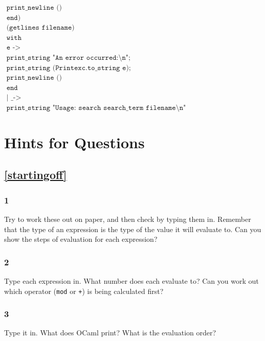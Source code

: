 \documentclass[]{book}
\newcommand{\smspace}{\vspace{4mm}}
\begin{document}
\begin{center}
{\begin{minipage}{0.9\textwidth}
$\texttt{\ \ \ \ \ \ \ \ \ \ \ \ \ \ \ \ \ \ \ print\_newline ()}$\\
$\texttt{\ \ \ \ \ \ \ \ \ \ \ \ \ \ \ \ \ end)}$\\
$\texttt{\ \ \ \ \ \ \ \ \ \ \ \ (getlines filename)}$\\
$\texttt{\ \ \ \ \ \ \ \ with}$\\
$\texttt{\ \ \ \ \ \ \ \ \ \ e ->}$\\
$\texttt{\ \ \ \ \ \ \ \ \ \ \ \ print\_string "An error occurred:\textbackslash n";}$\\
$\texttt{\ \ \ \ \ \ \ \ \ \ \ \ print\_string (Printexc.to\_string e);}$\\
$\texttt{\ \ \ \ \ \ \ \ \ \ \ \ print\_newline ()}$\\
$\texttt{\ \ \ \ \ \ end}$\\
$\texttt{\ \ | \_ ->}$\\
$\texttt{\ \ \ \ print\_string "Usage:\ search search\_term filename\textbackslash n"}$\vphantom{g}
\end{minipage}}
\end{center}
\smspace

\cleardoublepage
\flushbottom
\chapter{Hints for Questions}
\label{hints}
\section*{\ref{startingoff}\\ }
\subsection*{1}
Try to work these out on paper, and then check by typing them in. Remember that the type of an expression is the type of the value it will evaluate to. Can you show the steps of evaluation for each expression?

\subsection*{2}
Type each expression in. What number does each evaluate to? Can you work out which operator (\texttt{mod} or \texttt{+}) is being calculated first?

\subsection*{3}
Type it in. What does OCaml print? What is the evaluation order?
\end{document}
